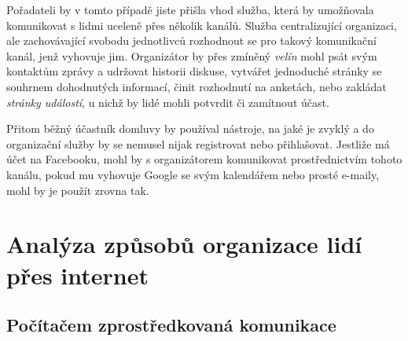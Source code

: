 \documentclass[12pt,oneside,final]{fithesis2}
\begin{document}
Pořadateli by v tomto případě jiste přišla vhod služba, která by u\-mož\-ňo\-va\-la komunikovat s lidmi uceleně přes několik kanálů. Služba centralizující organizaci, ale zachovávající svobodu jednotlivců rozhodnout se pro takový komunikační kanál, jenž vyhovuje jim. Organizátor by přes zmíněný {\it velín} mohl psát svým kontaktům zprávy a udržovat historii diskuse, vytvářet jednoduché stránky se souhrnem dohodnutých informací, činit rozhodnutí na anketách, nebo zakládat {\it stránky událostí}, u nichž by lidé mohli potvrdit či zamítnout účast.

Přitom běžný účastník domluvy by používal nástroje, na jaké je zvyklý a do organizační služby by se nemusel nijak registrovat nebo přihlašovat. Jestliže má účet na Facebooku, mohl by s organizátorem komunikovat pro\-střed\-nic\-tvím tohoto kanálu, pokud mu vyhovuje Google se svým kalendářem nebo prosté e-maily, mohl by je použít zrovna tak.









\chapter{Analýza způsobů organizace lidí přes internet}

\section{Počítačem zprostředkovaná komunikace}\label{cmc}
\end{document}
